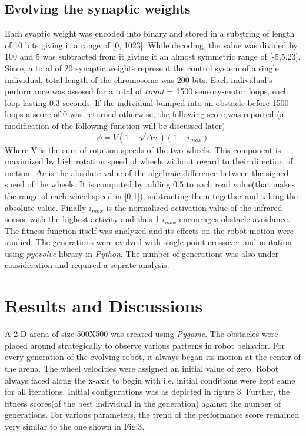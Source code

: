 \documentclass[12pt]{elsarticle}
\begin{document}
\subsection{Evolving the synaptic weights}
Each syaptic weight was encoded into binary and stored in a substring of length of 10 bits giving it a range of [0, 1023]. While decoding, the value was divided by 100 and 5 was subtracted from it giving it an almost symmetric range of [-5,5.23]. Since, a total of 20 synaptic weights represent the control system of a single individual, total length of the chromosome was 200 bits. 
Each individual's performance was assesed for a total of \textit{count} = 1500 sensory-motor loops, each loop lasting 0.3 seconds. 
If the individual bumped into an obstacle before 1500 loops a score of 0 was returned otherwise, the following score was reported (a modification of the following function will be discussed later)- 
\begin{equation}
\phi = V(1-\sqrt{\Delta v})(1-i_{max})
\end{equation}
Where V is the sum of rotation speeds of the two wheels. This component is maximized by high rotation speed of wheels  without regard to their direction of motion.  $\Delta v$ is the absolute value of the algebraic difference between the signed speed of the wheels. It is computed by adding 0.5 to each read value(that makes the range of each wheel speed in [0,1]), subtracting them together and taking the absolute value. Finally $i_{max}$ is the normalized activation value of the infrared sensor with the highest activity and thus 1-$i_{max}$ encourages obstacle avoidance. \\
The fitness function itself was analyzed and its effects on the robot motion were studied. The generations were evolved with single point crossover and mutation using \textit{pyevolve} library in \textit{Python}. The number of generations was also under consideration and required a seprate analysis.
\section{Results and Discussions}

A 2-D arena of size 500X500 was created using \textit{Pygame}. The obstacles were placed around strategically to observe various patterns in robot behavior. For every generation of the evolving robot, it always began its motion at the center of the arena. The wheel velocities were assigned an initial value of zero. Robot always faced along the x-axis to begin with i.e. initial conditions were kept same for all iterations. Initial configurations was as depicted in figure 3.
Further, the fitness scores(of the best individual in the generation) against the number of generations. For various parameters, the trend of the performance score remained very similar to the one shown in Fig.3.
\end{document}
